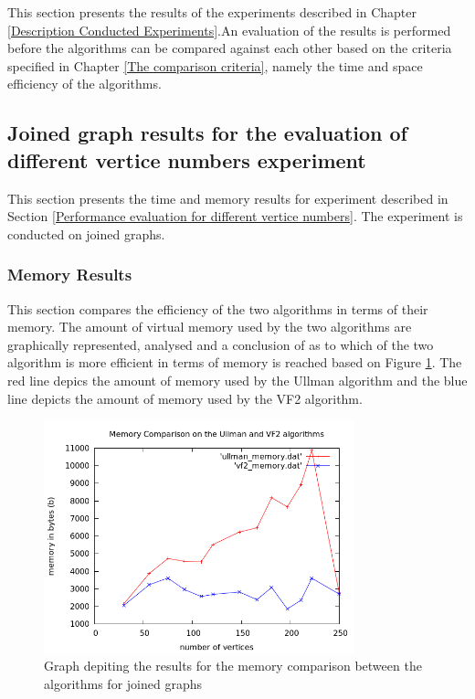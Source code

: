 \label{Experiment Results}
This section presents the results of the experiments described in Chapter \ref{Description Conducted Experiments}.An evaluation of the results is
performed before the algorithms can be compared against each other based on the criteria specified in Chapter \ref{The comparison criteria}, namely the time and 
space efficiency of the algorithms.

\subsection{Joined graph results for the evaluation of different vertice numbers experiment}
This section presents the time and memory results for experiment described in Section \ref{Performance evaluation for different vertice numbers}. The 
experiment is conducted on joined graphs.
\subsubsection{Memory Results}
\label{Memory Results}
This section compares the efficiency of the two algorithms in terms of their memory. The amount of virtual memory used by the two algorithms are graphically 
represented, analysed and a conclusion of as to which of the two algorithm is more efficient in terms of memory is reached based on Figure \ref{fig:memory_comparison}.
The red line depics the amount of memory used by the Ullman algorithm and the blue line depicts the amount of memory used by the VF2 algorithm.
\begin{figure}[H]
  \begin{center}
      \includegraphics[width=0.8\textwidth]{memory_comparison.png}
  \end{center}    
  \caption{Graph depiting the results for the memory comparison between the algorithms for joined graphs}
  \label{fig:memory_comparison}
\end{figure}

